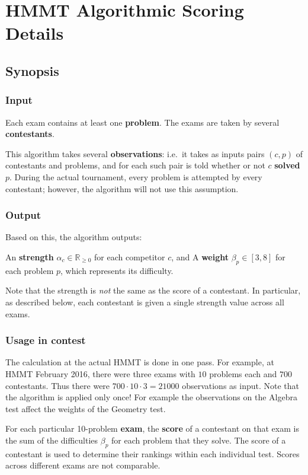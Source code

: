 \chapter{HMMT Algorithmic Scoring Details}
\section{Synopsis}
\subsection{Input}
Each exam contains at least one \textbf{problem}.
The exams are taken by several \textbf{contestants}.

This algorithm takes several \textbf{observations}:
i.e.\ it takes as inputs pairs $(c,p)$ of contestants and problems,
and for each such pair is told whether or not $c$ \textbf{solved} $p$.
During the actual tournament, every problem is attempted by every contestant;
however, the algorithm will not use this assumption.

\subsection{Output}
Based on this, the algorithm outputs:
\begin{itemize}
	\ii An \textbf{strength} $\alpha_c \in \mathbb R_{\ge 0}$ for each competitor $c$, and
	\ii A \textbf{weight} $\beta_p \in [3,8]$ for each problem $p$,
	which represents its difficulty.
\end{itemize}
Note that the strength is \emph{not} the same as the score of a contestant.
In particular, as described below,
each contestant is given a single strength value across all exams.

\subsection{Usage in contest}
The calculation at the actual HMMT is done in one pass.
For example, at HMMT February 2016, there were three exams with $10$ problems
each and $700$ contestants.
Thus there were $700 \cdot 10 \cdot 3 = 21000$ observations as input.
Note that the algorithm is applied only once!
For example the observations on the Algebra test
affect the weights of the Geometry test.

For each particular 10-problem \textbf{exam},
the \textbf{score} of a contestant on that exam is the sum of the 
difficulties $\beta_p$ for each problem that they solve.
The score of a contestant is used to determine their rankings
within each individual test.
Scores across different exams are not comparable.

